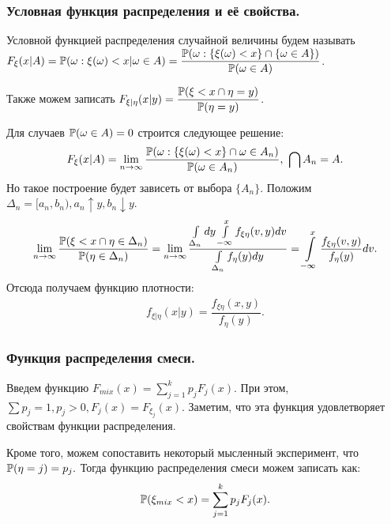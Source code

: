\subsubsection{Условная функция распределения и её свойства.}
\begin{definition}
    Условной функцией распределения случайной величины будем называть $F_{\xi}(x | A) = \P(\omega: \xi(\omega) < x | \omega \in A) = \dfrac{\P(\omega : \{\xi(\omega) < x \} \cap \{\omega \in A\})}{\P(\omega \in A)}$.

    \noindent Также можем записать $F_{\xi |\eta}(x | y) = \dfrac{\P(\xi < x \cap \eta = y)}{\P(\eta = y)}$.
\end{definition}
\begin{remark}
    Для случаев $\P(\omega \in A) = 0$ строится следующее решение: 
    \begin{gather*}
        F_{\xi}(x | A) = \lim_{n \to \infty} \dfrac{\P(\omega : \{ \xi(\omega) < x\} \cap \omega \in A_n )}{\P(\omega \in A_n)}, \ \bigcap A_n = A.
    \end{gather*}
    Но такое построение будет зависеть от выбора $\{A_n\}.$ Положим $\Delta_n = [a_n, b_n), a_n \uparrow y, b_n \downarrow y.$
    \begin{gather*}
        \lim_{n \to \infty} \dfrac{\P(\xi < x \cap \eta \in \Delta_n)}{\P(\eta \in \Delta_n)} = \lim_{n \to \infty} \dfrac{\int\limits_{\Delta_n} dy \int\limits_{-\infty}^{x} f_{\xi\eta} (v, y) dv}{\int\limits_{\Delta_n} f_{\eta} (y) dy} = \int\limits_{-\infty}^{x} \dfrac{f_{\xi\eta}(v, y)}{f_{\eta}(y)}dv.
    \end{gather*}
    Отсюда получаем функцию плотности: 
    \begin{gather*}
        f_{\xi |\eta}(x|y) = \dfrac{f_{\xi\eta}(x, y)}{f_{\eta}(y)}.
    \end{gather*}
\end{remark}


\subsubsection{Функция распределения смеси.}
Введем функцию $F_{mix}(x) = \sum\limits_{j = 1}^{k}p_jF_j(x)$. При этом, $\sum p_j = 1, p_j > 0, F_j(x) = F_{\xi_j}(x).$ Заметим, что эта функция удовлетворяет свойствам функции распределения. 

\noindent Кроме того, можем сопоставить некоторый мысленный эксперимент, что $\P(\eta = j) = p_j.$ Тогда функцию распределения смеси можем записать как:  
\begin{gather*}
    \P(\xi_{mix} < x) = \sum\limits_{j = 1}^{k}p_jF_j(x).
\end{gather*}